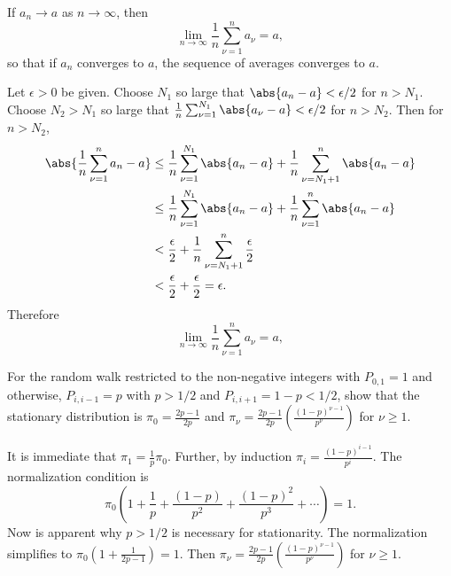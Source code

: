 \documentclass[12pt]{article}
\begin{document}
\begin{exercise}
    If \( a_n \to a \) as \( n \to \infty \), then
    \[
        \lim_{n \to \infty} \frac{1}{n} \sum\limits_{\nu=1}^{n} a_\nu =
        a,
    \] so that if \( a_n \) converges to \( a \), the sequence of
    averages converges to \( a \).
\end{exercise}
\begin{solution}
    Let \( \epsilon > 0 \) be given.  Choose \( N_1 \) so large that \(
    \abs{a_n - a} < \epsilon/2 \) for \( n > N_1 \).  Choose \( N_2 > N_1
    \) so large that \( \frac{1}{n} \sum_{\nu=1}^{N_1} \abs{a_{\nu} - a}
    < \epsilon/2 \) for \( n > N_2 \).  Then for \( n > N_2 \),
    \begin{align*}
        \abs{\frac{1}{n} \sum\limits_{\nu=1}^{n} a_n - a} &\le \frac{1}{n}
        \sum\limits_{\nu=1}^{N_1} \abs{a_n - a} + \frac{1}{n} \sum\limits_
        {\nu=N_1+1}^{n} \abs{a_n - a} \\
        &\le \frac{1}{n} \sum\limits_{\nu=1}^{N_1} \abs{a_n - a} + \frac
        {1}{n} \sum\limits_{\nu=1}^{n} \abs{a_n - a} \\
        &< \frac{\epsilon}{2} + \frac{1}{n} \sum\limits_{\nu=N_1+1}^{n}
        \frac{\epsilon}{2} \\
        &< \frac{\epsilon}{2} + \frac{\epsilon}{2} = \epsilon.
    \end{align*}
    Therefore
    \[
        \lim_{n \to \infty} \frac{1}{n} \sum\limits_{\nu=1}^{n} a_{\nu}
        = a,
    \]
\end{solution}

\begin{exercise}
For the  random walk restricted to the non-negative integers with
\( P_{0,1} = 1 \) and otherwise, \( P_{i,i-1} = p \) with \( p > 1/2 \)
and \( P_{i,i+1} = 1- p < 1/2 \), show that the stationary distribution is
\( \pi_0 = \frac{2p-1}{2p}
\) and \( \pi_{\nu} = \frac{2p-1}{2p} \left( \frac{(1-p)^{\nu -
      1}}{p^{\nu}} \right) \) for \( \nu \ge 1 \).
\end{exercise}
\begin{solution}
  It is immediate that \( \pi_1 = \frac{1}{p} \pi_0 \).  Further, by induction
  \( \pi_i = \frac{(1-p)^{i-1}}{p^i} \).  The normalization condition is
  \[
    \pi_0 \left( 1 + \frac{1}{p} + \frac{(1-p)}{p^2} + \frac{(1-p)^{2}}{p^3} + \cdots \right) = 1.
  \]
  Now is apparent why \( p > 1/2 \) is necessary for stationarity. The
  normalization simplifies to \( \pi_0 \left( 1 + \frac{1}{2p-1} \right) = 1 \).  Then
  \( \pi_{\nu} = \frac{2p-1}{2p} \left( \frac{(1-p)^{\nu -
      1}}{p^{\nu}} \right) \) for \( \nu \ge 1 \).
\end{solution}
\hr
\end{document}
